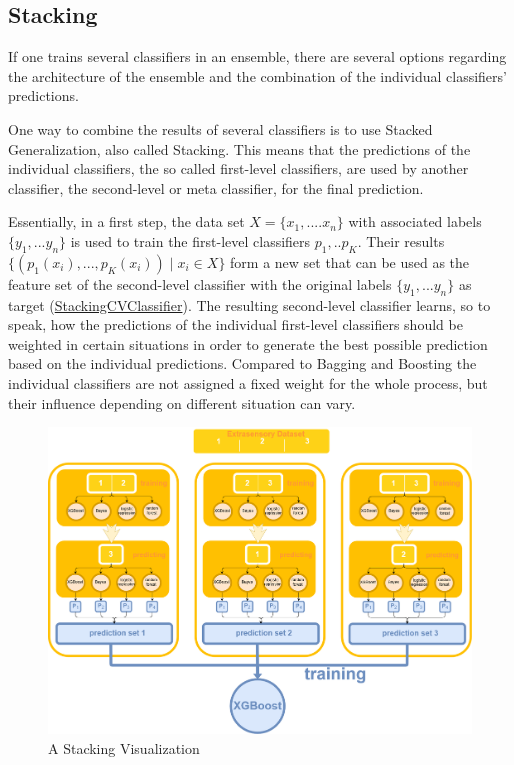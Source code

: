 \subsection{Stacking}\label{subsec:stacking}

If one trains several classifiers in an ensemble, there are several options regarding the architecture of the ensemble and the combination of the individual classifiers' predictions.

One way to combine the results of several classifiers is to use Stacked Generalization, also called Stacking. This means that the predictions of the individual classifiers, the so called first-level classifiers, are used by another classifier, the second-level or meta classifier, for the final prediction. 

Essentially, in a first step, the data set $X = \{x_1, ... .x_n\}$ with associated labels $\{y_1, ... y_n\}$ is used to train the first-level classifiers $p_1, .. p_K$. Their results $\{(p_1(x_i), ... , p_K(x_i)) \mid x_i \in X\}$ form a new set that can be used as the feature set of the second-level classifier with the original labels $\{y_1, ... y_n\}$ as target (\href{https://books.google.de/books?id=nwQZCwAAQBAJ&lpg=PA500&dq=stacking+classifier+subsets&pg=PA499&redir_esc=y#v=onepage&q&f=false}{StackingCVClassifier}).
The resulting second-level classifier learns, so to speak, how the predictions of the individual first-level classifiers should be weighted in certain situations in order to generate the best possible prediction based on the individual predictions. 
Compared to Bagging and Boosting the individual classifiers are not assigned a fixed weight for the whole process, but their influence depending on different situation can vary. 
 

\begin{figure}[H]
	\begin{center}
		\includegraphics[width=\textwidth]{images/stacking_diagram.png}
		\caption{A Stacking Visualization}
		\label{abb:stacking}
	\end{center}		
\end{figure}	

